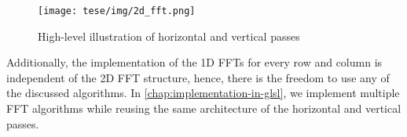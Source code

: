 \documentclass[
  oneside,
  11pt, a4paper,
  footinclude=true,
  headinclude=true,
  cleardoublepage=empty
]{scrbook}
\begin{document}

\begin{figure}[H]
    \centering
    \texttt{[image: tese/img/2d\_fft.png]}
    \caption{High-level illustration of horizontal and vertical passes}
    \label{fig:2d-fft}
\end{figure}

Additionally, the implementation of the 1D FFTs for every row and column is independent of the 2D FFT structure, hence, there is the freedom to use any of the discussed algorithms. In \autoref{chap:implementation-in-glsl}, we implement multiple FFT algorithms while reusing the same architecture of the horizontal and vertical passes.












\end{document}
